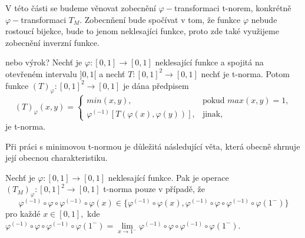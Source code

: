 V t\'eto \v c\'asti se budeme v\v enovat zobecn\v en\'i $\varphi-$transformaci t-norem, konkr\'etn\v e $\varphi-$transformaci $T_M.$ Zobecn\v nen\'i bude spo\v c\'ivat v tom, \v ze funkce $\varphi$ nebude rostouc\'i bijekce, bude to jenom neklesaj\'ici funkce, proto zde tak\'e vyu\v zijeme zobecn\v en\'i inverzn\'i funkce. 
\begin{sentence}\cite{KMP}\label{subnorma}{ \color{blue}nebo výrok?}
     Nech\v t je $\varphi : [0,1] \rightarrow [0,1]$ neklesající funkce a  spojitá na otev\v ren\'em intervalu
 $]0,1[$ a nech\v t $T: [0,1]^2 \rightarrow [0,1]$ nech\v t je t-norma. Potom funkce
    $(T)_\varphi : [0,1]^2 \rightarrow [0,1]$ je dána p\v redpisem $$(T)_\varphi (x,y)= \begin{cases} min(x,y), & \mbox {pokud } max(x,y) = 1,
    \\ \varphi^{(-1)}[T(\varphi(x), \varphi(y))], & \mbox {jinak,}
    \end{cases}$$
    je t-norma.
  \end{sentence}
Při práci s minimovou t-normou je d\r uležitá následující věta, která obecně shrnuje její obecnou charakteristiku.
\begin{sentence} 
\cite{hlinena}
\label{smut} Nech\v t je $\varphi \colon [0,1] \to [0,1]$ neklesající funkce. Pak je operace $(T_M)_\varphi\colon[0,1]^2\to[0,1]$  t-norma pouze v případě, že
$$\varphi^{(-1)}\circ\varphi\circ\varphi^{(-1)}\circ\varphi(x)\in \{\varphi^{(-1)}\circ\varphi(x),\varphi^{(-1)}\circ\varphi\circ\varphi^{(-1)}\circ\varphi(1^-)\}$$
pro každé $x\in[0,1],$ kde $\varphi^{(-1)}\circ\varphi\circ\varphi^{(-1)}\circ\varphi(1^-)=\lim\limits_{x\to 1^-}\varphi^{(-1)}\circ\varphi\circ\varphi^{(-1)}\circ\varphi(1^-).$
\end{sentence}
  
